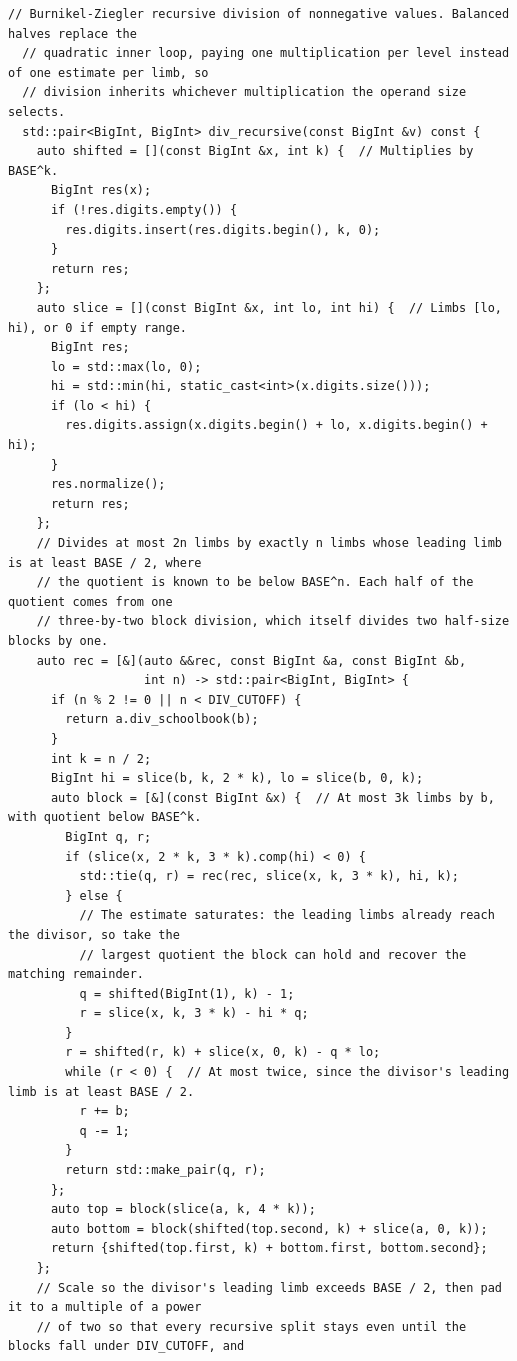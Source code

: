\begin{lstlisting}[style=cpp]
  // Burnikel-Ziegler recursive division of nonnegative values. Balanced halves replace the
  // quadratic inner loop, paying one multiplication per level instead of one estimate per limb, so
  // division inherits whichever multiplication the operand size selects.
  std::pair<BigInt, BigInt> div_recursive(const BigInt &v) const {
    auto shifted = [](const BigInt &x, int k) {  // Multiplies by BASE^k.
      BigInt res(x);
      if (!res.digits.empty()) {
        res.digits.insert(res.digits.begin(), k, 0);
      }
      return res;
    };
    auto slice = [](const BigInt &x, int lo, int hi) {  // Limbs [lo, hi), or 0 if empty range.
      BigInt res;
      lo = std::max(lo, 0);
      hi = std::min(hi, static_cast<int>(x.digits.size()));
      if (lo < hi) {
        res.digits.assign(x.digits.begin() + lo, x.digits.begin() + hi);
      }
      res.normalize();
      return res;
    };
    // Divides at most 2n limbs by exactly n limbs whose leading limb is at least BASE / 2, where
    // the quotient is known to be below BASE^n. Each half of the quotient comes from one
    // three-by-two block division, which itself divides two half-size blocks by one.
    auto rec = [&](auto &&rec, const BigInt &a, const BigInt &b,
                   int n) -> std::pair<BigInt, BigInt> {
      if (n % 2 != 0 || n < DIV_CUTOFF) {
        return a.div_schoolbook(b);
      }
      int k = n / 2;
      BigInt hi = slice(b, k, 2 * k), lo = slice(b, 0, k);
      auto block = [&](const BigInt &x) {  // At most 3k limbs by b, with quotient below BASE^k.
        BigInt q, r;
        if (slice(x, 2 * k, 3 * k).comp(hi) < 0) {
          std::tie(q, r) = rec(rec, slice(x, k, 3 * k), hi, k);
        } else {
          // The estimate saturates: the leading limbs already reach the divisor, so take the
          // largest quotient the block can hold and recover the matching remainder.
          q = shifted(BigInt(1), k) - 1;
          r = slice(x, k, 3 * k) - hi * q;
        }
        r = shifted(r, k) + slice(x, 0, k) - q * lo;
        while (r < 0) {  // At most twice, since the divisor's leading limb is at least BASE / 2.
          r += b;
          q -= 1;
        }
        return std::make_pair(q, r);
      };
      auto top = block(slice(a, k, 4 * k));
      auto bottom = block(shifted(top.second, k) + slice(a, 0, k));
      return {shifted(top.first, k) + bottom.first, bottom.second};
    };
    // Scale so the divisor's leading limb exceeds BASE / 2, then pad it to a multiple of a power
    // of two so that every recursive split stays even until the blocks fall under DIV_CUTOFF, and

\end{lstlisting}
